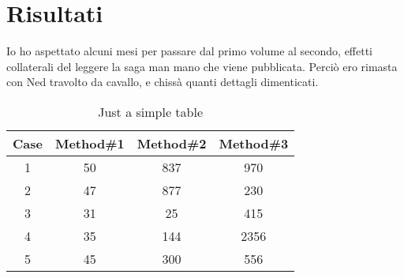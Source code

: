 \chapter{Risultati}

Io ho aspettato alcuni mesi per passare dal primo volume al secondo, effetti collaterali del leggere la saga man mano che viene pubblicata. Perciò ero rimasta con Ned travolto da cavallo, e chissà quanti dettagli dimenticati. 

\begin{table}[ht]
	
	\centering 
	\begin{tabular}{c c c c} 
		\hline\hline
		Case & Method\#1 & Method\#2 & Method\#3 \\ [0.5ex] %
		\hline %
		1 & 50 & 837 & 970 \\ %
		2 & 47 & 877 & 230 \\
		3 & 31 & 25 & 415 \\
		4 & 35 & 144 & 2356 \\
		5 & 45 & 300 & 556 \\ [1ex] %
		\hline 
	\end{tabular}
	\caption{Just a simple table} %
	\label{table:table_ex} %
\end{table}